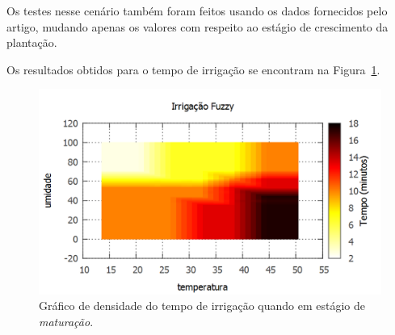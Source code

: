 \documentclass[
	article,			%
	11pt,				%
	oneside,			%
	a4paper,			%
	english,			%
	brazil,				%
	sumario=tradicional
	]{abntex2}
\begin{document}
\begin{multicols}{2}
Os testes nesse cenário também foram feitos usando os dados fornecidos pelo artigo, mudando apenas os valores com respeito ao estágio de crescimento da plantação.

Os resultados obtidos para o tempo de irrigação se encontram na Figura~\ref{fig:densidadematuracao}.

\begin{figure}[H]
  \centering
  \includegraphics[width=1\linewidth]{densidade_maturacao}
  \caption{Gráfico de densidade do tempo de irrigação quando em estágio de \textit{maturação}.}
  \label{fig:densidadematuracao}
\end{figure}


\end{multicols}

\pagebreak
\end{document}
